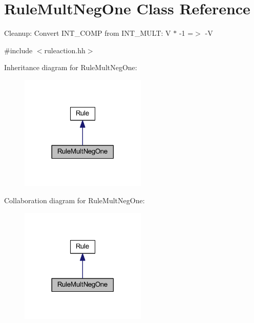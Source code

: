 \hypertarget{class_rule_mult_neg_one}{}\section{Rule\+Mult\+Neg\+One Class Reference}
\label{class_rule_mult_neg_one}


Cleanup\+: Convert I\+N\+T\+\_\+C\+O\+MP from I\+N\+T\+\_\+\+M\+U\+LT\+: {\ttfamily V $\ast$ -\/1 =$>$ -\/V}  




{\ttfamily \#include $<$ruleaction.\+hh$>$}



Inheritance diagram for Rule\+Mult\+Neg\+One\+:
\nopagebreak
\begin{figure}[H]
\begin{center}
\leavevmode
\includegraphics[width=170pt]{class_rule_mult_neg_one__inherit__graph}
\end{center}
\end{figure}


Collaboration diagram for Rule\+Mult\+Neg\+One\+:
\nopagebreak
\begin{figure}[H]
\begin{center}
\leavevmode
\includegraphics[width=170pt]{class_rule_mult_neg_one__coll__graph}
\end{center}
\end{figure}

